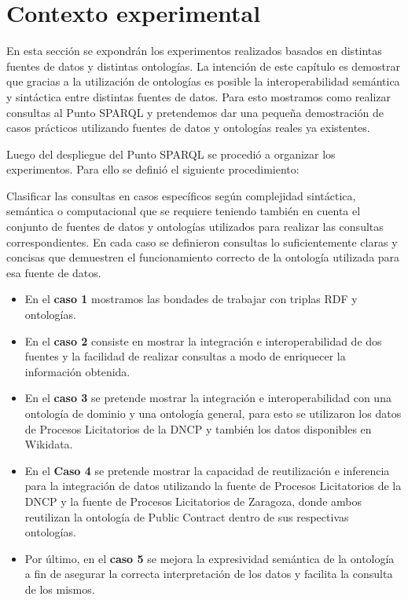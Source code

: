 \chapter{Contexto experimental}
\label{chap:Contexto experimental}


En esta sección se expondrán los experimentos realizados basados en distintas fuentes de datos y distintas ontologías. La intención de este capítulo es demostrar que gracias a la utilización de ontologías es posible la interoperabilidad semántica y sintáctica entre distintas fuentes de datos. Para esto mostramos como realizar consultas al Punto SPARQL y pretendemos dar una pequeña demostración de casos prácticos utilizando fuentes de datos y ontologías reales ya existentes. 

Luego del despliegue del Punto SPARQL se procedió a organizar los experimentos. Para ello se definió el siguiente procedimiento:

Clasificar las consultas en casos específicos según complejidad sintáctica, semántica o computacional que se requiere teniendo también en cuenta el conjunto de fuentes de datos y ontologías utilizados para realizar las consultas correspondientes.
En cada caso se definieron consultas lo suficientemente claras y concisas que demuestren el funcionamiento correcto de la ontología utilizada para esa fuente de datos.

\begin{itemize}
    \item En el \textbf{caso 1} mostramos las bondades de trabajar con triplas RDF y ontologías.
    \item  En el \textbf{caso 2} consiste en mostrar la integración e interoperabilidad de dos fuentes y la facilidad de realizar consultas a modo de enriquecer la información obtenida.
    \item En el \textbf{caso 3} se pretende mostrar la integración e interoperabilidad con una ontología de dominio y una ontología general, para esto se utilizaron los datos de Procesos Licitatorios de la DNCP y también los datos disponibles en Wikidata.
    \item En el \textbf{Caso 4} se pretende mostrar la capacidad de reutilización e inferencia para la integración de datos utilizando la fuente de Procesos Licitatorios de la DNCP y la fuente de Procesos Licitatorios de Zaragoza, donde ambos reutilizan la ontología de Public Contract dentro de sus respectivas ontologías.
    \item Por último, en el \textbf{caso 5} se mejora la expresividad semántica de la ontología a fin de asegurar la correcta interpretación de los datos y facilita la consulta de los mismos.
\end{itemize}
  

